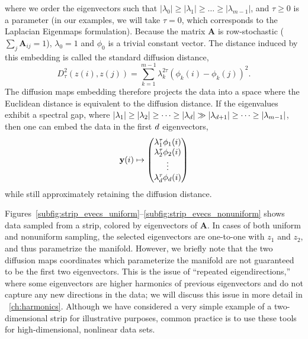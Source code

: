 %
where we order the eigenvectors such that $|\lambda_0| \ge |\lambda_1| \ge \dots \ge |\lambda_{m-1}|$, and $\tau \ge 0$ is a parameter (in our examples, we will take $\tau=0$, which corresponds to the Laplacian Eigenmaps formulation).
%
Because the matrix $\mathbf{A}$ is row-stochastic ($\sum_j \mathbf{A}_{ij} = 1$),  $\lambda_0 = 1$ and $\phi_0$ is a trivial constant vector.
%
The distance induced by this embedding is called the standard diffusion distance,
%
\begin{equation}
D^2_\tau(z(i), z(j)) = \sum_{k=1}^{m-1} \lambda_k^{2 \tau} \left( \phi_k(i) - \phi_k(j)  \right)^2.
\end{equation}
%
The diffusion maps embedding therefore projects the data into a space where the Euclidean distance is equivalent to the diffusion distance. 
%
If the eigenvalues exhibit a spectral gap, where $|\lambda_1| \ge |\lambda_2| \ge \dots \ge |\lambda_d | \gg |\lambda_{d+1} | \ge \dots \ge |\lambda_{m-1}|$, then one can embed the data in the first $d$ eigenvectors, 
\begin{equation} \label{eq:dmaps_embed_reduced}
\mathbf{y}(i) \mapsto 
\begin{pmatrix}
\lambda_1^\tau \phi_1(i) \\
\lambda_2^\tau \phi_2(i) \\
\vdots \\
\lambda_{d}^\tau  \phi_{d}(i)
\end{pmatrix}
\end{equation}
%
while still approximately retaining the diffusion distance. 

Figures~\ref{subfig:strip_evecs_uniform}--\ref{subfig:strip_evecs_nonuniform} shows data sampled from a strip, colored by eigenvectors of $\mathbf{A}$.
%
In cases of both uniform and nonuniform sampling, the selected eigenvectors are one-to-one with $z_1$ and $z_2$, and thus parametrize the manifold.
%
However, we briefly note that the two diffusion maps coordinates which parameterize the manifold are not guaranteed to be the first two eigenvectors.
%
This is the issue of ``repeated eigendirections,'' where some eigenvectors are higher harmonics of previous eigenvectors and do not capture any new directions in the data; we will discuss this issue in more detail in \chap~\ref{ch:harmonics}. 
%
%
Although we have considered a very simple example of a two-dimensional strip for illustrative purposes, common practice is to use these tools for high-dimensional, nonlinear data sets.

